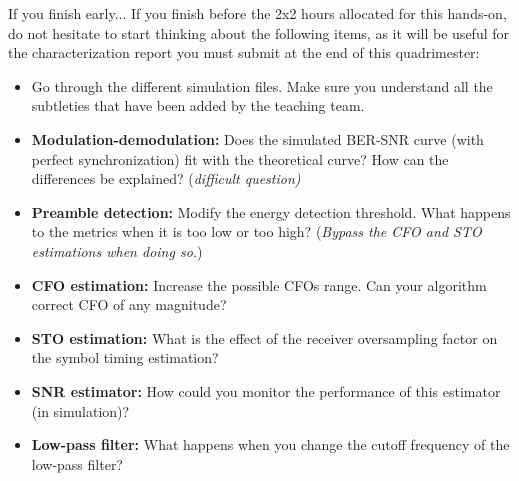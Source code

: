 \begin{bclogo}[couleur = gray!20, arrondi = 0.2, logo=\bcinfo]{If you finish early...}
If you finish before the 2x2 hours allocated for this hands-on, do not hesitate to start thinking about the following items, as it will be useful for the characterization report you must submit at the end of this quadrimester:
\begin{itemize}
    \item Go through the different simulation files. Make sure you understand all the subtleties that have been added by the teaching team.
    \item \textbf{Modulation-demodulation:} Does the simulated BER-SNR curve (with perfect synchronization) fit with the theoretical curve? How can the differences be explained? (\textit{difficult question)}
    \item \textbf{Preamble detection:} Modify the energy detection threshold. What happens to the metrics when it is too low or too high? (\textit{Bypass the CFO and STO estimations when doing so.})
    \item \textbf{CFO estimation:} Increase the possible CFOs range. Can your algorithm correct CFO of any magnitude?
    \item \textbf{STO estimation:} What is the effect of the receiver oversampling factor on the symbol timing estimation?
    \item \textbf{SNR estimator:} How could you monitor the performance of this estimator (in simulation)?
    \item \textbf{Low-pass filter:} What happens when you change the cutoff frequency of the low-pass filter?
\end{itemize}
\end{bclogo}



